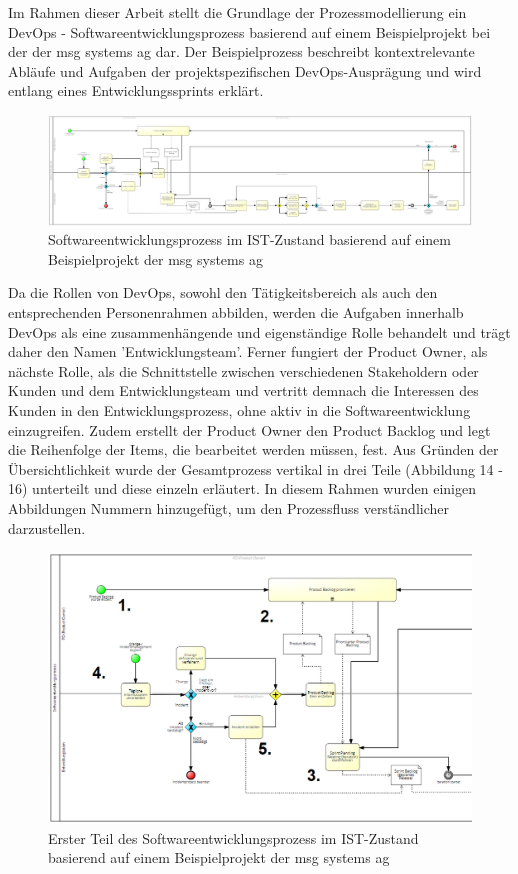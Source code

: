 Im Rahmen dieser Arbeit stellt die Grundlage der Prozessmodellierung ein DevOps - Softwareentwicklungsprozess basierend auf einem Beispielprojekt bei der der msg systems ag dar. Der Beispielprozess beschreibt kontextrelevante Abläufe und Aufgaben der projektspezifischen DevOps-Ausprägung und wird entlang eines Entwicklungssprints erklärt. \\ 

\begin{figure}[p]
    \centering
    \includegraphics[angle=90, scale=0.6]{Bilder/IST-Prozess_neu.png}
    \caption{Softwareentwicklungsprozess im IST-Zustand basierend auf einem Beispielprojekt der msg systems ag}
\end{figure} 

\newpage
Da die Rollen von DevOps, sowohl den Tätigkeitsbereich als auch den entsprechenden Personenrahmen abbilden, werden die Aufgaben innerhalb DevOps als eine zusammenhängende und eigenständige Rolle behandelt und trägt daher den Namen 'Entwicklungsteam'. Ferner fungiert der Product Owner, als nächste Rolle, als die Schnittstelle zwischen verschiedenen Stakeholdern oder Kunden und dem Entwicklungsteam und vertritt demnach die Interessen des Kunden in den Entwicklungsprozess, ohne aktiv in die Softwareentwicklung einzugreifen. Zudem erstellt der Product Owner den Product Backlog und legt die Reihenfolge der Items, die bearbeitet werden müssen, fest. Aus Gründen der Übersichtlichkeit wurde der Gesamtprozess vertikal in drei Teile (Abbildung 14 - 16) unterteilt und diese einzeln erläutert. In diesem Rahmen wurden einigen Abbildungen Nummern hinzugefügt, um den Prozessfluss verständlicher darzustellen.  

\begin{figure}[h]
    \centering
    \includegraphics[scale=0.5]{Bilder/IST-Prozess_first Partv2.png}
    \caption{Erster Teil des Softwareentwicklungsprozess im IST-Zustand basierend auf einem Beispielprojekt der msg systems ag}
\end{figure}

